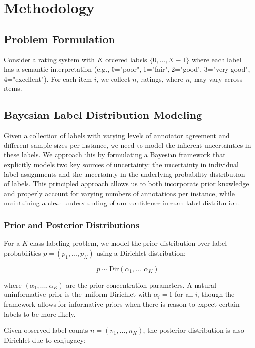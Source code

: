 \documentclass[journal]{IEEEtran}
\begin{document}
\section{Methodology}

\subsection{Problem Formulation}
Consider a rating system with $K$ ordered labels $\{0,...,K-1\}$ where each label has a semantic interpretation (e.g., 0="poor", 1="fair", 2="good", 3="very good", 4="excellent"). For each item $i$, we collect $n_i$ ratings, where $n_i$ may vary across items.

\subsection{Bayesian Label Distribution Modeling}
Given a collection of labels with varying levels of annotator agreement and different sample sizes per instance, we need to model the inherent uncertainties in these labels. We approach this by formulating a Bayesian framework that explicitly models two key sources of uncertainty: the uncertainty in individual label assignments and the uncertainty in the underlying probability distribution of labels. This principled approach allows us to both incorporate prior knowledge and properly account for varying numbers of annotations per instance, while maintaining a clear understanding of our confidence in each label distribution.

\subsubsection{Prior and Posterior Distributions}
For a $K$-class labeling problem, we model the prior distribution over label probabilities $p = (p_1, ..., p_K)$ using a Dirichlet distribution:

\begin{equation}
p \sim \text{Dir}(\alpha_1, ..., \alpha_K)
\end{equation}

where $(\alpha_1, ..., \alpha_K)$ are the prior concentration parameters. A natural uninformative prior is the uniform Dirichlet with $\alpha_i = 1$ for all $i$, though the framework allows for informative priors when there is reason to expect certain labels to be more likely.

Given observed label counts $n = (n_1, ..., n_K)$, the posterior distribution is also Dirichlet due to conjugacy:
\end{document}
